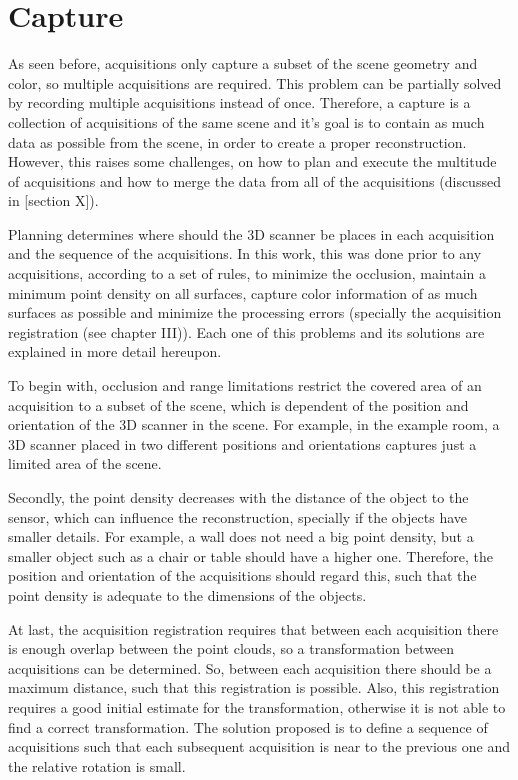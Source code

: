 \section{Capture}
\label{section:capture}

As seen before, acquisitions only capture a subset of the scene geometry and color, so multiple acquisitions are required. This problem can be partially solved by recording multiple acquisitions instead of once. Therefore, a capture is a collection of acquisitions of the same scene and it's goal is to contain as much data as possible from the scene, in order to create a proper reconstruction. However, this raises some challenges, on how to plan and execute the multitude of acquisitions and how to merge the data from all of the acquisitions (discussed in [section X]).

Planning determines where should the 3D scanner be places in each acquisition and the sequence of the acquisitions. In this work, this was done prior to any acquisitions, according to a set of rules, to minimize the occlusion, maintain a minimum point density on all surfaces, capture color information of as much surfaces as possible and minimize the processing errors (specially the acquisition registration (see chapter III)). Each one of this problems and its solutions are explained in more detail hereupon.

To begin with, occlusion and range limitations restrict the covered area of an acquisition to a subset of the scene, which is dependent of the position and orientation of the 3D scanner in the scene. For example, in the example room, a 3D scanner placed in two different positions and orientations captures just a limited area of the scene.

Secondly, the point density decreases with the distance of the object to the sensor, which can influence the reconstruction, specially if the objects have smaller details. For example, a wall does not need a big point density, but a smaller object such as a chair or table should have a higher one. Therefore, the position and orientation of the acquisitions should regard this, such that the point density is adequate to the dimensions of the objects.

At last, the acquisition registration requires that between each acquisition there is enough overlap between the point clouds, so a transformation between acquisitions can be determined. So, between each acquisition there should be a maximum distance, such that this registration is possible. Also, this registration requires a good initial estimate for the transformation, otherwise it is not able to find a correct transformation. The solution proposed is to define a sequence of acquisitions such that each subsequent acquisition is near to the previous one and the relative rotation is small.

